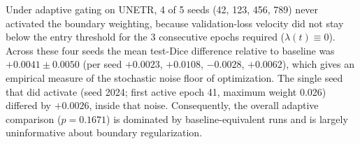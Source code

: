 \documentclass[10pt, a4paper, twocolumn]{article}
\begin{document}
Under adaptive gating on UNETR, 4 of 5 seeds (42, 123, 456, 789) never activated the boundary weighting, because validation-loss velocity did not stay below the entry threshold for the 3 consecutive epochs required ($\lambda(t) \equiv 0$). Across these four seeds the mean test-Dice difference relative to baseline was $+0.0041 \pm 0.0050$ (per seed $+0.0023$, $+0.0108$, $-0.0028$, $+0.0062$), which gives an empirical measure of the stochastic noise floor of optimization. The single seed that did activate (seed 2024; first active epoch 41, maximum weight 0.026) differed by $+0.0026$, inside that noise. Consequently, the overall adaptive comparison ($p=0.1671$) is dominated by baseline-equivalent runs and is largely uninformative about boundary regularization.

\begin{table}[t]
\centering
\small
\caption{Gradient-norm telemetry at the trained fixed-schedule checkpoint (seed 42), averaged over validation batches.}
\label{tab:telemetry}
\vspace{4pt}
\end{table}
\end{document}
